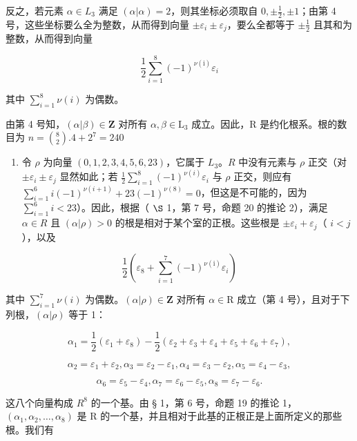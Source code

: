 反之，若元素 \(\alpha \in L_3\) 满足 \((\alpha |\alpha) = 2\)，则其坐标必须取自 \(0, \pm \frac{1}{2}, \pm 1\)；由第 4 号，这些坐标要么全为整数，从而得到向量 \(\pm \varepsilon_i \pm \varepsilon_j\)，要么全都等于 \(\pm \frac{1}{2}\) 且其和为整数，从而得到向量

\[
\frac {1}{2} \sum_ {i = 1} ^ {8} (- 1) ^ {\nu (\mathrm{i})} \varepsilon_ {i}
\]

其中 \(\sum_{i=1}^{8} \nu(i)\) 为偶数。

  由第 4 号知，\((\alpha |\beta)\in \mathbf{Z}\) 对所有 \(\alpha ,\beta \in \mathrm{L}_3\) 成立。因此，R 是约化根系。根的数目为 \(n = \binom{8}{2}.4 + 2^7 = 240\)

\begin{enumerate}
\def\labelenumi{(\Roman{enumi})}
\setcounter{enumi}{1}
\tightlist
\item
  令 \(\rho\) 为向量 \((0,1,2,3,4,5,6,23)\)，它属于 \(L_{3}\)。\(R\) 中没有元素与 \(\rho\) 正交（对 \(\pm \varepsilon_{i} \pm \varepsilon_{j}\) 显然如此；若 \(\frac{1}{2} \sum_{i=1}^{8} (-1)^{\nu(i)} \varepsilon_{i}\) 与 \(\rho\) 正交，则应有 \(\sum_{i=1}^{6} i(-1)^{\nu(i+1)} + 23(-1)^{\nu(8)} = 0\)，但这是不可能的，因为 \(\sum_{i=1}^{6} i < 23\)）。因此，根据（ \(\S\) 1，第 7 号，命题 20 的推论 2），满足 \(\alpha \in R\) 且 \((\alpha | \rho) > 0\) 的根是相对于某个室的正根。这些根是 \(\pm \varepsilon_{i} + \varepsilon_{j}\)（ \(i < j\)），以及
\end{enumerate}

\[
\frac {1}{2} \left(\varepsilon_ {8} + \sum_ {i = 1} ^ {7} (- 1) ^ {\nu (\mathrm{i})} \varepsilon_ {i}\right)
\]

  其中 \(\sum_{i=1}^{7} \nu(i)\) 为偶数。\((\alpha|\rho) \in \mathbf{Z}\) 对所有 \(\alpha \in \mathrm{R}\) 成立（第 4 号），且对于下列根，\((\alpha|\rho)\) 等于 1：

\[
\alpha_ {1} = \frac {1}{2} (\varepsilon_ {1} + \varepsilon_ {8}) - \frac {1}{2} (\varepsilon_ {2} + \varepsilon_ {3} + \varepsilon_ {4} + \varepsilon_ {5} + \varepsilon_ {6} + \varepsilon_ {7}),
\]

\[
\alpha_ {2} = \varepsilon_ {1} + \varepsilon_ {2}, \alpha_ {3} = \varepsilon_ {2} - \varepsilon_ {1}, \alpha_ {4} = \varepsilon_ {3} - \varepsilon_ {2}, \alpha_ {5} = \varepsilon_ {4} - \varepsilon_ {3},
\]

\[
\alpha_ {6} = \varepsilon_ {5} - \varepsilon_ {4}, \alpha_ {7} = \varepsilon_ {6} - \varepsilon_ {5}, \alpha_ {8} = \varepsilon_ {7} - \varepsilon_ {6}.
\]

这八个向量构成 \(R^{8}\) 的一个基。由 § 1，第 6 号，命题 19 的推论 1，\((\alpha_{1}, \alpha_{2}, \ldots, \alpha_{8})\) 是 R 的一个基，并且相对于此基的正根正是上面所定义的那些根。我们有


